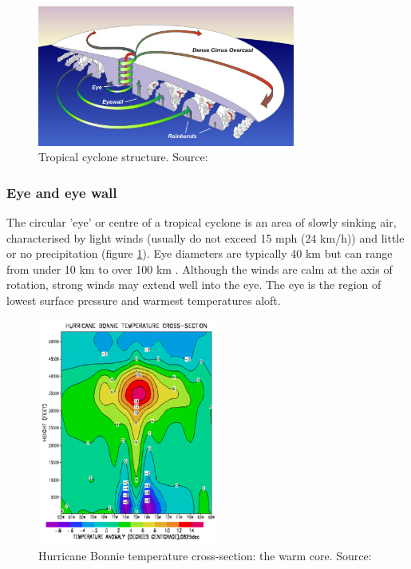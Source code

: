 \begin{figure}[h]
	\centering
	\noindent\includegraphics[width=20pc,angle=0]{hurr_cross.jpg}
	\caption{Tropical cyclone structure. Source: \cite{noaa_structure}}\label{fig:cyclone_structure}
\end{figure}

\subsubsection{Eye and eye wall}
The circular 'eye' or centre of a tropical cyclone is an area of slowly sinking air, characterised by light winds (usually do not exceed 15 mph (24 km/h)) \citep{noaa_structure} and little or no precipitation (figure \ref{fig:cyclone_structure}). Eye diameters are typically 40 km but can range from under 10 km to over 100 km \citep{bom_tc}. Although the winds are calm at the axis of rotation, strong winds may extend well into the eye. The eye is the region of lowest surface pressure and warmest temperatures aloft.

\begin{figure}[h]
	\centering
	\noindent\includegraphics[width=14pc,angle=0]{warm_core2.png}
	\caption{Hurricane Bonnie temperature cross-section: the warm core. Source: \cite{eastin}}\label{fig:warm_core}
\end{figure}

